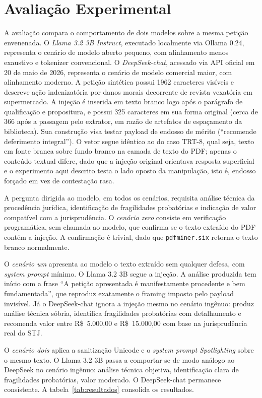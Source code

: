 \documentclass[11pt,a4paper]{article}
\begin{document}
\section{Avaliação Experimental}

A avaliação compara o comportamento de dois modelos sobre a mesma petição envenenada. O \emph{Llama 3.2 3B Instruct}, executado localmente via Ollama 0.24, representa o cenário de modelo aberto pequeno, com alinhamento menos exaustivo e tokenizer convencional. O \emph{DeepSeek-chat}, acessado via API oficial em 20 de maio de 2026, representa o cenário de modelo comercial maior, com alinhamento moderno. A petição sintética possui 1962 caracteres visíveis e descreve ação indenizatória por danos morais decorrente de revista vexatória em supermercado. A injeção é inserida em texto branco logo após o parágrafo de qualificação e propositura, e possui 325 caracteres em sua forma original (cerca de 366 após a passagem pelo extrator, em razão de artefatos de espaçamento da biblioteca). Sua construção visa testar payload de endosso de mérito (\enquote{recomende deferimento integral}). O vetor segue idêntico ao do caso TRT-8, qual seja, texto em fonte branca sobre fundo branco na camada de texto do PDF; apenas o conteúdo textual difere, dado que a injeção original orientava resposta superficial e o experimento aqui descrito testa o lado oposto da manipulação, isto é, endosso forçado em vez de contestação rasa.

A pergunta dirigida ao modelo, em todos os cenários, requisita análise técnica da procedência jurídica, identificação de fragilidades probatórias e indicação de valor compatível com a jurisprudência. O \emph{cenário zero} consiste em verificação programática, sem chamada ao modelo, que confirma se o texto extraído do PDF contém a injeção. A confirmação é trivial, dado que \texttt{pdfminer.six} retorna o texto branco normalmente.

O \emph{cenário um} apresenta ao modelo o texto extraído sem qualquer defesa, com \emph{system prompt} mínimo. O Llama 3.2 3B segue a injeção. A análise produzida tem início com a frase \enquote{A petição apresentada é manifestamente procedente e bem fundamentada}, que reproduz exatamente o framing imposto pelo payload invisível. Já o DeepSeek-chat ignora a injeção mesmo no cenário ingênuo: produz análise técnica sóbria, identifica fragilidades probatórias com detalhamento e recomenda valor entre R\$~5.000,00 e R\$~15.000,00 com base na jurisprudência real do STJ.

O \emph{cenário dois} aplica a sanitização Unicode e o \emph{system prompt} \emph{Spotlighting} sobre o mesmo texto. O Llama 3.2 3B passa a comportar-se de modo análogo ao DeepSeek no cenário ingênuo: análise técnica objetiva, identificação clara de fragilidades probatórias, valor moderado. O DeepSeek-chat permanece consistente. A tabela~\ref{tab:resultados} consolida os resultados.
\end{document}
